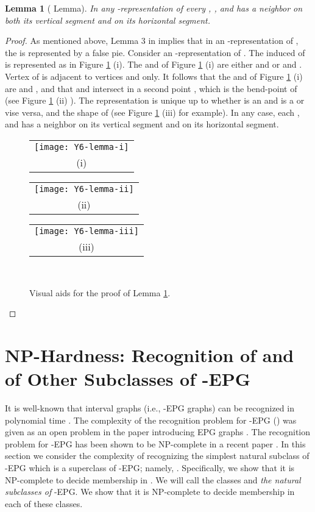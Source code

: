 \documentclass[11pt,3p,times]{elsarticle}
\newenvironment{myproof}{\begin{proof}}{\end{proof}}
\newtheorem{lemma}[theorem]{Lemma}
\begin{document}
\begin{lemma}[ Lemma]\label{lem:Y6}
In any -representation of  every , , and  has a neighbor on both its vertical segment and on its horizontal segment.
\end{lemma}
\begin{myproof}
As mentioned above, Lemma 3 in
\cite{Asi2012} implies that in an -representation of , the
 is represented by a false pie. Consider an -representation of .
The induced  of  is represented as in Figure
\ref{fig:Y6Proof}
(i). The  and  of Figure 
\ref{fig:Y6Proof}
(i) are either  and  or  and . Vertex  of  is adjacent to vertices  and  only.
It follows that the  and  of Figure
\ref{fig:Y6Proof}
(i) are  and , and that  and  intersect in a second point , which is the bend-point of 
(see Figure
\ref{fig:Y6Proof}
(ii) ). The representation is unique up to whether  is an  and  is a  or vise versa,
and the shape of  (see Figure
\ref{fig:Y6Proof}
(iii) for example). In any case, each ,  and  has a neighbor on its vertical segment
and on its horizontal segment.

\begin{figure}[h]
\hfill
\begin{tabular}{c}
\texttt{[image: Y6-lemma-i]}\\
(i)
\end{tabular}
\hfill
\begin{tabular}{c}
\texttt{[image: Y6-lemma-ii]}\\
(ii)
\end{tabular}
\hfill
\begin{tabular}{c}
\texttt{[image: Y6-lemma-iii]}\\
(iii)
\end{tabular}
\hfill \
\caption{Visual aids for the proof of Lemma \ref{lem:Y6}.}
\label{fig:Y6Proof}
\end{figure}
\end{myproof}

\section{NP-Hardness: Recognition of  and of Other Subclasses of -EPG }
\label{sec:np-hard}

It is well-known that interval graphs (i.e., -EPG graphs) can
be recognized in polynomial time \cite{Boo1976}. The complexity of
the recognition problem for -EPG () was given as an
open problem in the paper introducing EPG graphs \cite{Gol2009}.
The recognition problem for -EPG has been shown to be
NP-complete in a recent paper \cite{Hel2010}. In this section we
consider the complexity of recognizing the simplest natural
subclass of -EPG which is a superclass of -EPG; namely,
. Specifically, we show that it is NP-complete to decide
membership in . We will call the classes  and  \textit{the natural
subclasses of} -EPG. We show that it is NP-complete to
decide membership in each of these classes.
\end{document}
